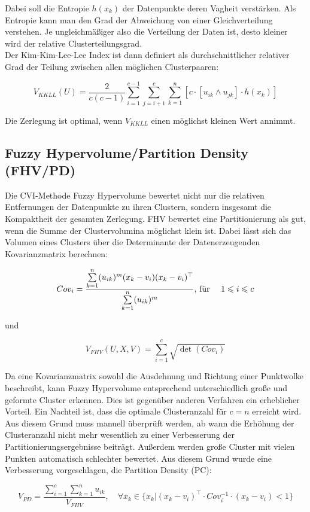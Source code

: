 \documentclass[11pt,ceqn]{book}
\begin{document}
Dabei soll die Entropie $h(x_k)$ der Datenpunkte deren Vagheit verstärken. Als Entropie kann man den Grad der Abweichung von einer Gleichverteilung verstehen. Je ungleichmäßiger also die Verteilung der Daten ist, desto kleiner wird der relative Clusterteilungsgrad.
\\
Der Kim-Kim-Lee-Lee Index ist dann definiert als durchschnittlicher
relativer Grad der Teilung zwischen allen möglichen Clusterpaaren:

$$V_{KKLL}(U) = \frac{2}{c(c-1)} \sum_{i=1}^{c-1} \sum_{j=i+1}^c \sum_{k=1}^n \left[c \cdot \left[u_{ik} \land u_{jk} \right]\cdot h(x_k)\right]$$

Die Zerlegung ist optimal, wenn $V_{KKLL}$ einen möglichst kleinen Wert annimmt.

\subsection{Fuzzy Hypervolume/Partition Density (FHV/PD)}
Die CVI-Methode Fuzzy Hypervolume \cite{fhv} bewertet nicht nur die relativen Entfernungen der Datenpunkte zu ihren Clustern, sondern insgesamt die Kompaktheit der gesamten Zerlegung. FHV bewertet eine Partitionierung als gut, wenn die Summe der Clustervolumina möglichst klein ist. Dabei lässt sich das Volumen eines Clusters über die Determinante der Datenerzeugenden Kovarianzmatrix berechnen: 

$$Cov_i = \frac{\sum\limits_{k=1}^n (u_{ik})^m (x_k-v_i)(x_k-v_i)^{\top}}{\sum\limits_{k=1}^n (u_{ik})^m} \text{,\ für \quad} 1\leqslant i\leqslant c$$

und

$$V_{FHV}(U,X,V) = \sum_{i=1}^c \sqrt{\det(Cov_i)}$$

Da eine Kovarianzmatrix sowohl die Ausdehnung und Richtung einer Punktwolke beschreibt, kann Fuzzy Hypervolume entsprechend unterschiedlich große und geformte Cluster erkennen. Dies ist gegenüber anderen Verfahren ein erheblicher Vorteil. Ein Nachteil ist, dass die optimale Clusteranzahl für $c=n$ erreicht wird. Aus diesem Grund muss manuell überprüft werden, ab wann die Erhöhung der Clusteranzahl nicht mehr wesentlich zu einer Verbesserung der Partitionierungsergebnisse beiträgt. Außerdem werden große Cluster mit vielen Punkten automatisch schlechter bewertet. Aus diesem Grund wurde eine Verbesserung vorgeschlagen, die Partition Density (PC):

$$V_{PD}=\frac{\sum\limits_{i=1}^c \sum\limits_{k=1}^n u_{ik}}{V_{FHV}},\quad \forall x_k \in \{x_k|(x_k-v_i)^{\top}\cdot Cov_i^{-1}\cdot(x_k-v_i)<1\}$$
\end{document}
